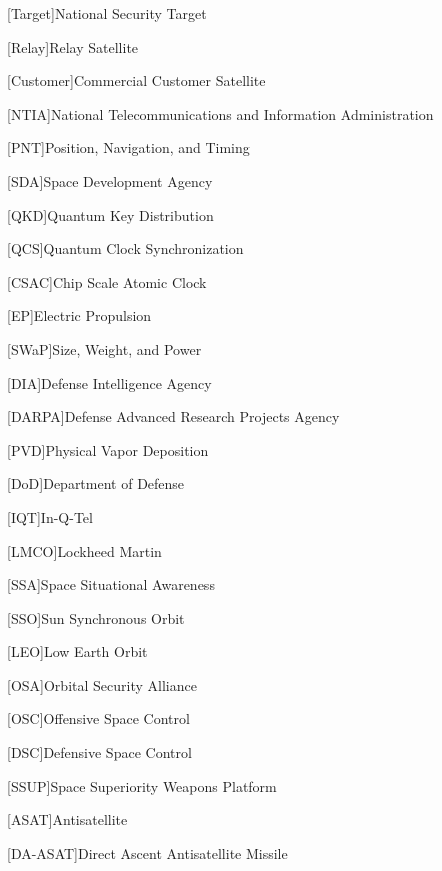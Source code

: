 


[Target]{National Security Target}

[Relay]{Relay Satellite}

[Customer]{Commercial Customer Satellite}

[NTIA]{National Telecommunications and Information
  Administration}

[PNT]{Position, Navigation, and Timing}

[SDA]{Space Development Agency}

[QKD]{Quantum Key Distribution}

[QCS]{Quantum Clock Synchronization}

[CSAC]{Chip Scale Atomic Clock}

[EP]{Electric Propulsion}

[SWaP]{Size, Weight, and Power}

[DIA]{Defense Intelligence Agency}

[DARPA]{Defense Advanced Research Projects Agency}

[PVD]{Physical Vapor Deposition}

[DoD]{Department of Defense}

[IQT]{In-Q-Tel}

[LMCO]{Lockheed Martin}

[SSA]{Space Situational Awareness}

[SSO]{Sun Synchronous Orbit}

[LEO]{Low Earth Orbit}

[OSA]{Orbital Security Alliance}

[OSC]{Offensive Space Control}

[DSC]{Defensive Space Control}

[SSUP]{Space Superiority Weapons Platform}

[ASAT]{Antisatellite}

[DA-ASAT]{Direct Ascent Antisatellite Missile}

